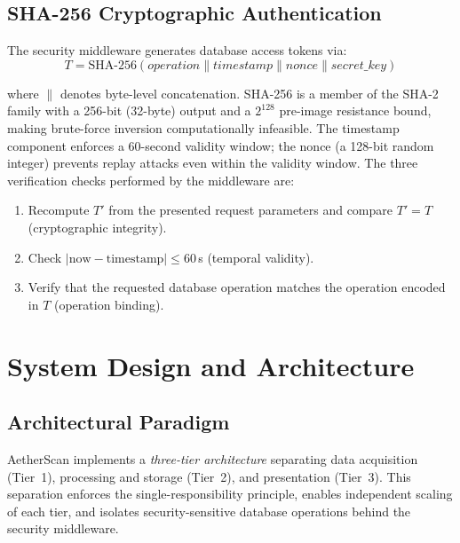 \documentclass[12pt,a4paper]{article}
\begin{document}
\subsection{SHA-256 Cryptographic Authentication}
\label{sec:background:sha}

The security middleware generates database access tokens via:
\begin{equation}
T = \text{SHA-256}(\textit{operation} \| \textit{timestamp}
    \| \textit{nonce} \| \textit{secret\_key})
\label{eq:sha256}
\end{equation}

\noindent where $\|$ denotes byte-level concatenation.
SHA-256 is a member of the SHA-2 family with a 256-bit (32-byte) output and a
$2^{128}$ pre-image resistance bound, making brute-force inversion
computationally infeasible. The timestamp component enforces a 60-second
validity window; the nonce (a 128-bit random integer) prevents replay attacks
even within the validity window. The three verification checks performed by the
middleware are:
\begin{enumerate}
\item Recompute $T'$ from the presented request parameters and compare
      $T' = T$ (cryptographic integrity).
\item Check $|\text{now} - \text{timestamp}| \leq 60$\,s (temporal validity).
\item Verify that the requested database operation matches the operation
      encoded in $T$ (operation binding).
\end{enumerate}

\clearpage
\section{System Design and Architecture}
\label{sec:sysdesign}

\subsection{Architectural Paradigm}
\label{sec:sysdesign:paradigm}

AetherScan implements a \emph{three-tier architecture} separating data
acquisition (Tier~1), processing and storage (Tier~2), and presentation (Tier~3).
This separation enforces the single-responsibility principle, enables independent
scaling of each tier, and isolates security-sensitive database operations behind
the security middleware.
\end{document}
